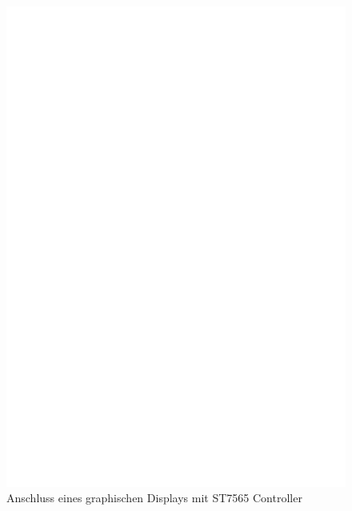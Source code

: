 \begin{figure}[H]
\centering
\includegraphics[width=14cm]{../FIG/ST7565lcd.eps}
\caption{Anschluss eines graphischen Displays mit ST7565 Controller}
\label{fig:ST7565lcd}
\end{figure}

